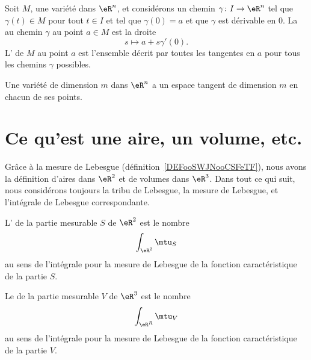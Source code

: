 Soit $M$, une variété dans $\eR^n$, et considérons un chemin $\gamma\colon I\to \eR^n$ tel que $\gamma(t)\in M$ pour tout $t\in I$ et tel que $\gamma(0)=a$ et que $\gamma$ est dérivable en $0$. La  au chemin $\gamma$ au point $a\in M$ est la droite
\begin{equation}
    s\mapsto a+s\gamma'(0).
\end{equation}
L' de $M$ au point $a$ est l'ensemble décrit par toutes les tangentes en $a$ pour tous les chemins $\gamma$ possibles.

\begin{proposition}         \label{PropDimEspTanVarConst}
    Une variété de dimension $m$ dans $\eR^n$ a un espace tangent de dimension $m$ en chacun de ses points.
\end{proposition}

\section{Ce qu'est une aire, un volume, etc.}

Grâce à la mesure de Lebesgue (définition~\ref{DEFooSWJNooCSFeTF}), nous avons la définition d'aires dans \( \eR^2\) et de volumes dans \( \eR^3\). Dans tout ce qui suit, nous considérons toujours la tribu de Lebesgue, la mesure de Lebesgue, et l'intégrale de Lebesgue correspondante.

\begin{definition}      \label{DEFooPZRDooWbbBXy}
    L' de la partie mesurable \( S\) de \( \eR^2\) est le nombre
    \begin{equation}
        \int_{\eR^2}\mtu_S
    \end{equation}
    au sens de l'intégrale pour la mesure de Lebesgue de la fonction caractéristique de la partie \( S\).
\end{definition}

\begin{definition}
    Le  de la partie mesurable \( V\) de \( \eR^3\) est le nombre
    \begin{equation}
        \int_{\eR^R}\mtu_V
    \end{equation}
    au sens de l'intégrale pour la mesure de Lebesgue de la fonction caractéristique de la partie \( V\).
\end{definition}

